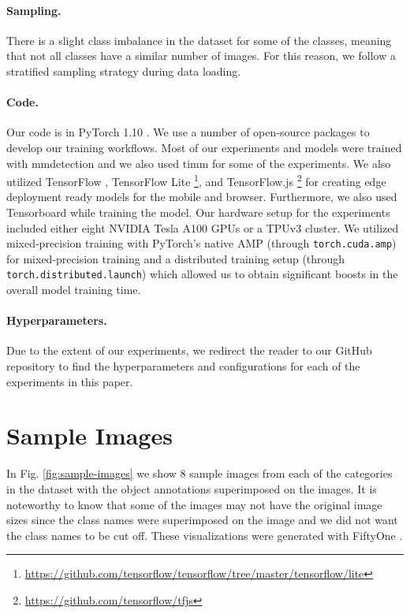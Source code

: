 \documentclass{article}
\begin{document}
\paragraph{Sampling.} There is a slight class imbalance in the dataset for some of the classes, meaning that not all classes have a similar number of images. For this reason, we follow a stratified sampling strategy during data loading.

\paragraph{Code. } Our code is in PyTorch 1.10 \cite{paszke2019pytorch}. We use a number of open-source packages to develop our training workflows. Most of our experiments and models were trained with mmdetection \cite{mmdetection} and we also used timm \citep{rw2019timm} for some of the experiments. We also utilized TensorFlow \cite{45381}, TensorFlow Lite \footnote{\url{https://github.com/tensorflow/tensorflow/tree/master/tensorflow/lite}}, and TensorFlow.js \footnote{\url{https://github.com/tensorflow/tfjs}} for creating edge deployment ready models for the mobile and browser. Furthermore, we also used Tensorboard \cite{tensorflow2015-whitepaper} while training the model. Our hardware setup for the experiments included either eight NVIDIA Tesla A100 GPUs or a TPUv3 cluster. We utilized mixed-precision training with PyTorch's native AMP (through \texttt{torch.cuda.amp}) for mixed-precision training and a distributed training setup (through \texttt{torch.distributed.launch}) which allowed us to obtain significant boosts in the overall model training time.

\paragraph{Hyperparameters.} Due to the extent of our experiments, we redirect the reader to our GitHub repository to find the hyperparameters and configurations for each of the experiments in this paper.

\section{Sample Images}
\label{appendix:sample-images}

In Fig. \ref{fig:sample-images} we show 8 sample images from each of the categories in the dataset with the object annotations superimposed on the images. It is noteworthy to know that some of the images may not have the original image sizes since the class names were superimposed on the image and we did not want the class names to be cut off. These visualizations were generated with FiftyOne \cite{moore2020fiftyone}.
\end{document}
